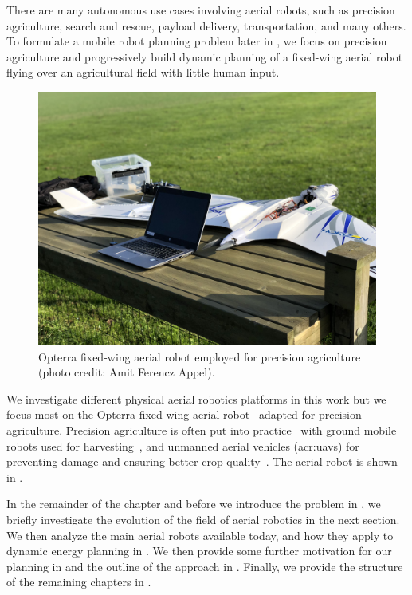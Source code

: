 There are many autonomous use cases involving aerial robots, such as precision agriculture, search and rescue, payload delivery, transportation, and many others. To formulate a mobile robot planning problem later in , we focus on precision agriculture and progressively build dynamic planning of a fixed-wing aerial robot flying over an agricultural field with little human input.

\begin{figure}[t]
  \centering
  \includegraphics[width=.7\textwidth]{pictures/photo}
  \caption[Opterra fixed-wing aerial robot]{Opterra fixed-wing aerial robot employed for precision agriculture {\scriptsize(photo credit: Amit Ferencz Appel)}.}   
  \label{fig:opterra}
\end{figure}

We investigate different physical aerial robotics platforms in this work but we focus most on the Opterra fixed-wing aerial robot~\citep{opterra} adapted for precision agriculture. Precision agriculture is often put into practice~\citep{hajjaj2014review} with ground mobile robots used for harvesting~\citep{qingchun2012study,dong2011development, de2011design, aljanobi2010setup, li2008analysis, edan2000robotic}, and unmanned aerial vehicles (\Gls{acr:uav}s) for preventing damage and ensuring better crop quality~\citep{puri2017agriculture, daponte2019review}. The aerial robot is shown in .

In the remainder of the chapter and before we introduce the problem in , we briefly investigate the evolution of the field of aerial robotics in the next section. We then analyze the main aerial robots available today, and how they apply to dynamic energy planning in . We then provide some further motivation for our planning in  and the outline of the approach in . Finally, we provide the structure of the remaining chapters in .

